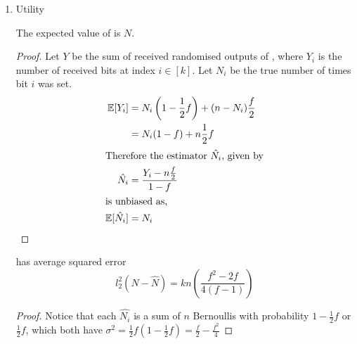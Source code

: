 \documentclass{article}
\begin{document}
\begin{enumerate}
\begin{proof}
\begin{align}
{			}\nonumber\\
			&=\max_{y\in S}\left[%
				\prod\limits_{i=1}^m \left(\frac{1}{2}f\right)^{2(1-y_i)}\left(1-\frac{1}{2}f\right)^{2y_i}%
				\times \prod\limits_{i=m+1}^{2m}\left(\frac{1}{2}f\right)^{2y_i} \left(1-\frac{1}{2}f\right)^{2(1-y_i)}\right]\label{eq:maximise-product}%
	\end{align}
	Equation~\ref{eq:maximise-product} is maximised when $y_1=1,...,y_m=1$, and $y_{m+1},...,y_{2m}=0$, giving
	\begin{align*}
		D &\leq \left(1-\frac{1}{2}f\right)^{2m}\times\left(\frac{1}{2}f\right)^{-2m}\\
			&= \left(\frac{2-f}{f}\right)^{2m}
	\end{align*}
	Therefore,
	\begin{equation}
		\varepsilon = 2m\log\left(\frac{2-f}{f}\right)
	\end{equation}
\end{proof}
\item Utility
\begin{theorem}
\label{thm:unbiased-estimator}
	The expected value of  is $N$.
\end{theorem}
\begin{proof} Let $Y$ be the sum of received randomised outputs of , where $Y_i$ is the number of received bits at index $i\in [k]$. Let $N_i$ be the true number of times bit $i$ was set.
\begin{align}
\mathbb{E}[Y_i] &= N_i\left(1-\frac{1}{2}f\right) + (n-N_i)\frac{f}{2}\nonumber\\
	&= N_i(1-f) + n\frac{1}{2}f\nonumber\\
	\intertext{Therefore the estimator $\hat{N_i}$, given by}
\hat{N_i} &= \frac{Y_i-n\frac{f}{2}}{1-f}\label{eq:estimator}\\
\intertext{is unbiased as,}
\mathbb{E}[\hat{N_i}] &= N_i
\end{align}
\end{proof}
\begin{theorem}
	 has average squared error
	\begin{equation*}
		l_2^2(N-\hat{N}) = kn\left(\frac{f^2-2f}{4(f-1)}\right)
	\end{equation*}
\end{theorem}
\begin{proof}\hfill
Notice that each $\hat{N_i}$ is a sum of $n$ Bernoullis with probability $1-\frac{1}{2}f$ or $\frac{1}{2}f$, which both have $\sigma^2 = \frac{1}{2}f\left(1-\frac{1}{2}f\right) = \frac{f}{2}-\frac{f^2}{4}$

\end{proof}
\end{enumerate}
\end{document}
